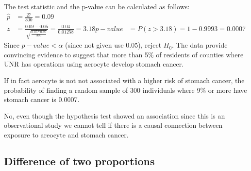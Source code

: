{{\begin{enumerate}[1.]
\end{enumerate}
The test statistic and the p-value can be calculated as follows:
\begin{align*}
\hat{p} &= \frac{27}{300} = 0.09 \\
z &= \frac{0.09 - 0.05}{ \sqrt{ \frac{0.05 * 0.95}{300} } } = \frac{0.04}{0.01258} = 3.18
p-value &= P(z > 3.18) = 1 - 0.9993 = 0.0007
\end{align*}
Since $p-value < \alpha$ (since not given use 0.05), reject $H_0$. The data provide convincing evidence to suggest that more than 5\% of residents of counties where UNR has operations using aerocyte develop stomach cancer.
}\label{aerocyte}
}

%

{
{If in fact aerocyte is not not associated with a higher risk of stomach cancer, the probability of finding a random sample of 300 individuals where 9\% or more have stomach cancer is 0.0007.}
}

%

{
{
No, even though the hypothesis test showed an association since this is an observational study we cannot tell if there is a causal connection between exposure to areocyte and stomach cancer.
}
}

%

\subsection{Difference of two proportions}

